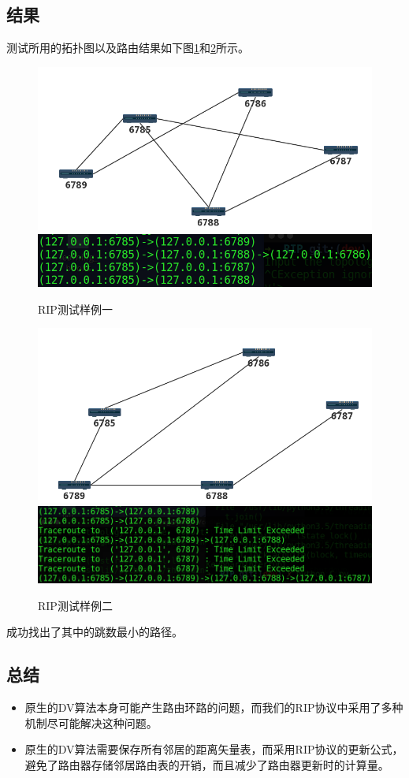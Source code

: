	\subsection{结果} %
	\label{sub:结果}
		测试所用的拓扑图以及路由结果如下图\ref{fig:ripTest1}和\ref{fig:ripTest2}所示。
		\begin{figure}[H]
			\centering
			\includegraphics[scale=0.4]{imgs/topo1/tpop1.png}
			\includegraphics[scale=0.5]{imgs/ripTest1.PNG}
			\caption{RIP测试样例一}
			\label{fig:ripTest1}
		\end{figure}
		\begin{figure}[H]
			\centering
			\includegraphics[scale=0.4]{imgs/topo1/topo2.png}
			\includegraphics[scale=0.4]{imgs/ripTest2.PNG}
			\caption{RIP测试样例二}
			\label{fig:ripTest2}
		\end{figure}
		成功找出了其中的跳数最小的路径。
	\subsection{总结} %
	\label{sub:总结}
		\begin{itemize}
			\item 原生的DV算法本身可能产生路由环路的问题，而我们的RIP协议中采用了多种机制尽可能解决这种问题。
			\item 原生的DV算法需要保存所有邻居的距离矢量表，而采用RIP协议的更新公式，避免了路由器存储邻居路由表的开销，而且减少了路由器更新时的计算量。
		\end{itemize}
	


